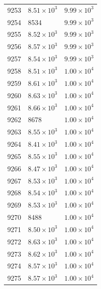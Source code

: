 \begin{table}[H]
\begin{tabular}{lll}
9253 & $\displaystyle 8.51 \times 10^{3}$ & $\displaystyle 9.99 \times 10^{3}$ \\
9254 & 8534 & $\displaystyle 9.99 \times 10^{3}$ \\
9255 & $\displaystyle 8.52 \times 10^{3}$ & $\displaystyle 9.99 \times 10^{3}$ \\
9256 & $\displaystyle 8.57 \times 10^{3}$ & $\displaystyle 9.99 \times 10^{3}$ \\
9257 & $\displaystyle 8.54 \times 10^{3}$ & $\displaystyle 9.99 \times 10^{3}$ \\
9258 & $\displaystyle 8.51 \times 10^{3}$ & $\displaystyle 1.00 \times 10^{4}$ \\
9259 & $\displaystyle 8.61 \times 10^{3}$ & $\displaystyle 1.00 \times 10^{4}$ \\
9260 & $\displaystyle 8.63 \times 10^{3}$ & $\displaystyle 1.00 \times 10^{4}$ \\
9261 & $\displaystyle 8.66 \times 10^{3}$ & $\displaystyle 1.00 \times 10^{4}$ \\
9262 & 8678 & $\displaystyle 1.00 \times 10^{4}$ \\
9263 & $\displaystyle 8.55 \times 10^{3}$ & $\displaystyle 1.00 \times 10^{4}$ \\
9264 & $\displaystyle 8.41 \times 10^{3}$ & $\displaystyle 1.00 \times 10^{4}$ \\
9265 & $\displaystyle 8.55 \times 10^{3}$ & $\displaystyle 1.00 \times 10^{4}$ \\
9266 & $\displaystyle 8.47 \times 10^{3}$ & $\displaystyle 1.00 \times 10^{4}$ \\
9267 & $\displaystyle 8.53 \times 10^{3}$ & $\displaystyle 1.00 \times 10^{4}$ \\
9268 & $\displaystyle 8.54 \times 10^{3}$ & $\displaystyle 1.00 \times 10^{4}$ \\
9269 & $\displaystyle 8.53 \times 10^{3}$ & $\displaystyle 1.00 \times 10^{4}$ \\
9270 & 8488 & $\displaystyle 1.00 \times 10^{4}$ \\
9271 & $\displaystyle 8.50 \times 10^{3}$ & $\displaystyle 1.00 \times 10^{4}$ \\
9272 & $\displaystyle 8.63 \times 10^{3}$ & $\displaystyle 1.00 \times 10^{4}$ \\
9273 & $\displaystyle 8.62 \times 10^{3}$ & $\displaystyle 1.00 \times 10^{4}$ \\
9274 & $\displaystyle 8.57 \times 10^{3}$ & $\displaystyle 1.00 \times 10^{4}$ \\
9275 & $\displaystyle 8.57 \times 10^{3}$ & $\displaystyle 1.00 \times 10^{4}$ \\

\end{tabular}
\end{table}
